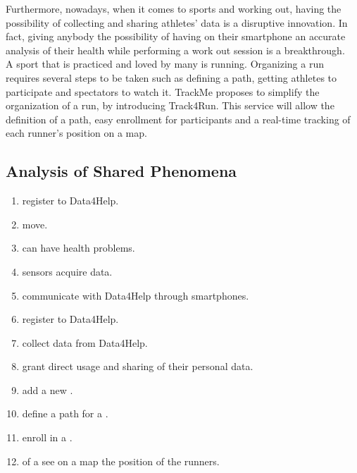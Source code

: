 \documentclass[../../rasd.tex]{subfiles}
\begin{document}
Furthermore, nowadays, when it comes to sports and working out, having the possibility of collecting and sharing athletes' data is a disruptive innovation. In fact, giving anybody the possibility of having on their smartphone an accurate analysis of their health while performing a work out session is a breakthrough.\\
A sport that is practiced and loved by many is running. Organizing a run requires several steps to be taken such as defining a path, getting athletes to participate and spectators to watch it. TrackMe proposes to simplify the organization of a run, by introducing Track4Run. This service will allow the definition of a path, easy enrollment for participants and a real-time tracking of each runner’s position on a map.


\subsection{Analysis of Shared Phenomena}


\begin{enumerate}
	\item {} register to Data4Help.
	\item {} move.
	\item {} can have health problems.
	\item {} sensors acquire data.
	\item {} communicate with Data4Help through smartphones.
	\item {} register to Data4Help.
	\item {} collect data from Data4Help.
	\item {} grant direct usage and sharing of their personal data.
	\item {} add a new .
	\item {} define a path for a .
	\item {} enroll in a .
	\item {} of a  see on a map the position of the runners.
\end{enumerate}
\end{document}

